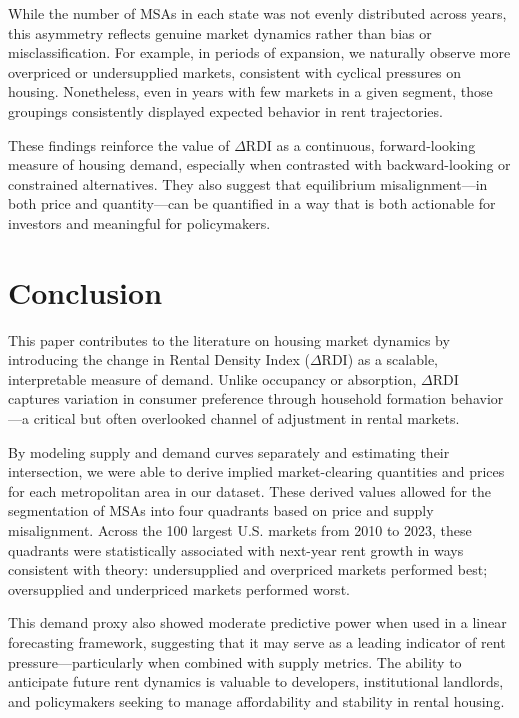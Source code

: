 \documentclass[APA,Times1COL]{WileyNJDv5} %
\begin{document}
While the number of MSAs in each state was not evenly distributed across years, this asymmetry reflects genuine market dynamics rather than bias or misclassification. For example, in periods of expansion, we naturally observe more overpriced or undersupplied markets, consistent with cyclical pressures on housing. Nonetheless, even in years with few markets in a given segment, those groupings consistently displayed expected behavior in rent trajectories.

These findings reinforce the value of \(\Delta\text{RDI}\) as a continuous, forward-looking measure of housing demand, especially when contrasted with backward-looking or constrained alternatives. They also suggest that equilibrium misalignment---in both price and quantity---can be quantified in a way that is both actionable for investors and meaningful for policymakers.

\section{Conclusion}

This paper contributes to the literature on housing market dynamics by introducing the change in Rental Density Index (\(\Delta\text{RDI}\)) as a scalable, interpretable measure of demand. Unlike occupancy or absorption, \(\Delta\text{RDI}\) captures variation in consumer preference through household formation behavior---a critical but often overlooked channel of adjustment in rental markets.

By modeling supply and demand curves separately and estimating their intersection, we were able to derive implied market-clearing quantities and prices for each metropolitan area in our dataset. These derived values allowed for the segmentation of MSAs into four quadrants based on price and supply misalignment. Across the 100 largest U.S. markets from 2010 to 2023, these quadrants were statistically associated with next-year rent growth in ways consistent with theory: undersupplied and overpriced markets performed best; oversupplied and underpriced markets performed worst.

This demand proxy also showed moderate predictive power when used in a linear forecasting framework, suggesting that it may serve as a leading indicator of rent pressure---particularly when combined with supply metrics. The ability to anticipate future rent dynamics is valuable to developers, institutional landlords, and policymakers seeking to manage affordability and stability in rental housing.
\end{document}
